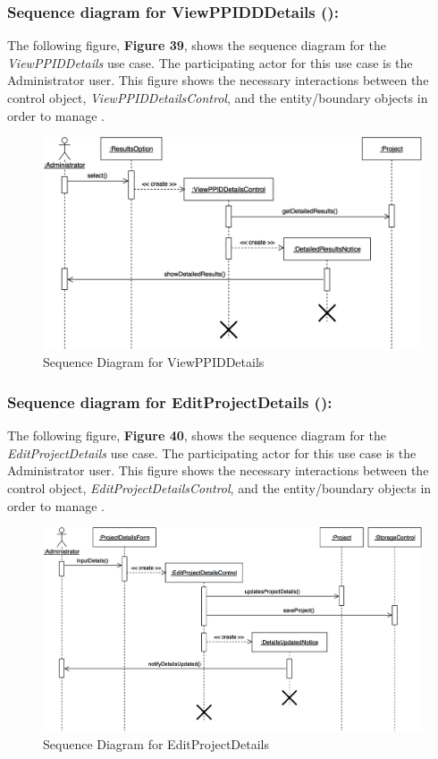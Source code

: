 \documentclass[12pt,letterpaper]{article}
\begin{document}
\subsubsection*{Sequence diagram for ViewPPIDDDetails (\viewppiddetails{}):}

The following figure, {\bf Figure 39}, shows the sequence diagram for the {\it ViewPPIDDetails} use case. The participating actor for this use case is
the Administrator user. This figure shows the necessary interactions between the control object, {\it ViewPPIDDetailsControl}, and the
entity/boundary objects in order to manage \viewppiddetails{}.

\begin{figure}[H]
	\centering{}
	\includegraphics[scale=0.3]{imgs/seq/view-ppid-details.png}
	\caption{Sequence Diagram for ViewPPIDDetails}
\end{figure}

\subsubsection*{Sequence diagram for EditProjectDetails (\editprojectdetails{}):}

The following figure, {\bf Figure 40}, shows the sequence diagram for the {\it EditProjectDetails} use case. The participating actor for this use case is
the Administrator user. This figure shows the necessary interactions between the control object, {\it EditProjectDetailsControl}, and the
entity/boundary objects in order to manage \editprojectdetails{}.

\begin{figure}[H]
	\centering{}
	\includegraphics[scale=0.3]{imgs/seq/edit-project-details.png}
	\caption{Sequence Diagram for EditProjectDetails}
\end{figure}
\end{document}
